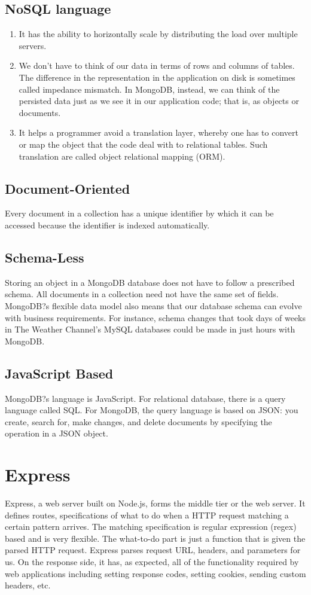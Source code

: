 \documentclass[12pt,a4paper]{report}
\begin{document}
\subsection{NoSQL language}\cite{parking_marketplace_srs}
\begin{enumerate}
	\renewcommand{\labelenumi}{{\textbf{\arabic{enumi}.}}}
	\item It has the ability to horizontally scale by distributing the load over multiple servers.  
	\item We don't have to think of our data in terms of rows and columns of tables. The difference in the representation in the application on disk is sometimes called impedance mismatch. In MongoDB, instead, we can think of the persisted data just as we see it in our application code; that is, as objects or documents.
	\item It helps a programmer avoid a translation layer, whereby one has to convert or map the object that the code deal with to relational tables. Such translation are called object relational mapping (ORM).  
\end{enumerate}
\subsection{Document-Oriented}
Every document in a collection has a unique identifier by which it can be accessed because the identifier is indexed automatically.
\subsection{Schema-Less}
Storing an object in a MongoDB database does not have to follow a prescribed schema. All documents in a collection need not have the same set of fields. MongoDB?s flexible data model also means that our database schema can evolve with business requirements. For instance, schema changes that took days of weeks in The Weather Channel's MySQL databases could be made in just hours with MongoDB.  
\subsection{JavaScript Based}
MongoDB?s language is JavaScript. For relational database, there is a query language called SQL. For MongoDB, the query language is based on JSON: you create, search for, make changes, and delete documents by specifying the operation in a JSON object. 
\section{Express}
Express, \cite{wiki:express} a web server built on Node.js, forms the middle tier or the web server. It defines routes, specifications of what to do when a HTTP request matching a certain pattern arrives. The matching specification is regular expression (regex) based and is very flexible. The what-to-do part is just a function that is given the parsed HTTP request. Express parses request URL, headers, and parameters for us. On the response side, it has, as expected, all of the functionality required by web applications including setting response codes, setting cookies, sending custom headers, etc.  
\end{document}
